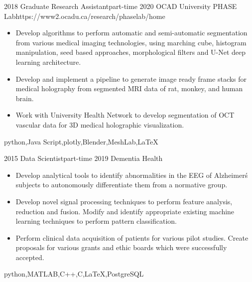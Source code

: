 \begin{experiences}
	\myExperience
	{2018}       {Graduate Research Assistant}{part-time}
	{2020}      {OCAD University PHASE Lab}{https://www2.ocadu.ca/research/phaselab/home}
	{
		\begin{itemize}
			\item Develop algorithms to perform automatic and semi-automatic segmentation from various medical imaging technologies, using marching cube, histogram manipulation, seed based approaches, morphological filters and U-Net deep learning architecture.
			\item Develop and implement a pipeline to generate image ready frame stacks for medical holography from segmented MRI data of rat, monkey, and human brain.
			\item Work with University Health Network to develop segmentation of OCT vascular data for 3D medical holographic visualization.
		\end{itemize}
	}
	{python,Java Script,plotly,Blender,MeshLab,\LaTeX}
	
	\emptySeparator	
	
	\myExperience
	{2015}       {Data Scientist}{part-time}
	{2019}      {Dementia Health}{}
	{
		\begin{itemize}
			\item Develop analytical tools to identify abnormalities in the EEG of Alzheimer\'s subjects to autonomously differentiate them from a normative group.
			\item  Develop novel signal processing techniques to perform feature analysis, reduction and fusion. Modify and identify appropriate existing machine learning techniques to perform pattern classification.
			\item Perform clinical data acquisition of patients for various pilot studies. Create proposals for various grants and ethic boards which were successfully accepted.
		\end{itemize}
	}
	{python,MATLAB,C++,C,\LaTeX,PostgreSQL}
	
	\emptySeparator
	

\end{experiences}
